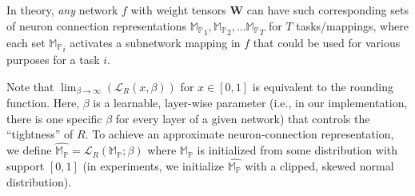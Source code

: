 \documentclass{article}
\begin{document}
In theory, \textit{any} network $f$ with weight tensors $\mathbf{W}$ can have such corresponding sets of neuron connection representations $\mathbb{M_P}_1,\mathbb{M_P}_2, \dots \mathbb{M_P}_T$ for $T$ tasks/mappings, where each set $\mathbb{M_P}_i$ activates a subnetwork mapping in $f$ that could be used for various purposes for a task $i$.



Note that $\lim_{\beta \rightarrow \infty} (\mathcal{L}_R(x, \beta))$ for $x \in [0,1]$ is equivalent to the rounding function. Here, $\beta$ is a learnable, layer-wise parameter (i.e., in our implementation, there is one specific $\beta$ for every layer of a given network) that controls the ``tightness'' of $R$. To achieve an approximate neuron-connection representation, we define $\hat{\mathbb{M_P}} = \mathcal{L}_R(\mathbb{M_P}; \beta)$ where $\mathbb{M_P}$ is initialized from some distribution with support $[0,1]$ (in experiments, we initialize $\hat{\mathbb{M_P}}$ with a clipped, skewed normal distribution). 
\end{document}
